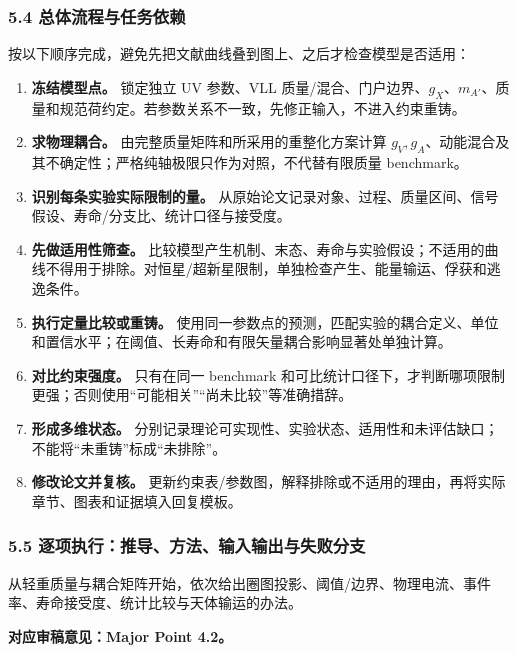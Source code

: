 \documentclass[
]{article}
\providecommand{\tightlist}{%
  \setlength{\itemsep}{0pt}\setlength{\parskip}{0pt}}
\begin{document}
\subsubsection{5.4
总体流程与任务依赖}\label{ux603bux4f53ux6d41ux7a0bux4e0eux4efbux52a1ux4f9dux8d56-3}

按以下顺序完成，避免先把文献曲线叠到图上、之后才检查模型是否适用：

\begin{enumerate}
\def\labelenumi{\arabic{enumi}.}
\tightlist
\item
  \textbf{冻结模型点。} 锁定独立 UV 参数、VLL
  质量/混合、门户边界、\(g_X\)、\(m_{A'}\)、质量和规范荷约定。若参数关系不一致，先修正输入，不进入约束重铸。
\item
  \textbf{求物理耦合。} 由完整质量矩阵和所采用的重整化方案计算
  \(g_V,g_A\)、动能混合及其不确定性；严格纯轴极限只作为对照，不代替有限质量
  benchmark。
\item
  \textbf{识别每条实验实际限制的量。}
  从原始论文记录对象、过程、质量区间、信号假设、寿命/分支比、统计口径与接受度。
\item
  \textbf{先做适用性筛查。}
  比较模型产生机制、末态、寿命与实验假设；不适用的曲线不得用于排除。对恒星/超新星限制，单独检查产生、能量输运、俘获和逃逸条件。
\item
  \textbf{执行定量比较或重铸。}
  使用同一参数点的预测，匹配实验的耦合定义、单位和置信水平；在阈值、长寿命和有限矢量耦合影响显著处单独计算。
\item
  \textbf{对比约束强度。} 只有在同一 benchmark
  和可比统计口径下，才判断哪项限制更强；否则使用``可能相关''``尚未比较''等准确措辞。
\item
  \textbf{形成多维状态。}
  分别记录理论可实现性、实验状态、适用性和未评估缺口；不能将``未重铸''标成``未排除''。
\item
  \textbf{修改论文并复核。}
  更新约束表/参数图，解释排除或不适用的理由，再将实际章节、图表和证据填入回复模板。
\end{enumerate}

\subsubsection{5.5
逐项执行：推导、方法、输入输出与失败分支}\label{ux9010ux9879ux6267ux884cux63a8ux5bfcux65b9ux6cd5ux8f93ux5165ux8f93ux51faux4e0eux5931ux8d25ux5206ux652f-3}

从轻重质量与耦合矩阵开始，依次给出圈图投影、阈值/边界、物理电流、事件率、寿命接受度、统计比较与天体输运的办法。

\textbf{对应审稿意见：Major Point 4.2。}
\end{document}
